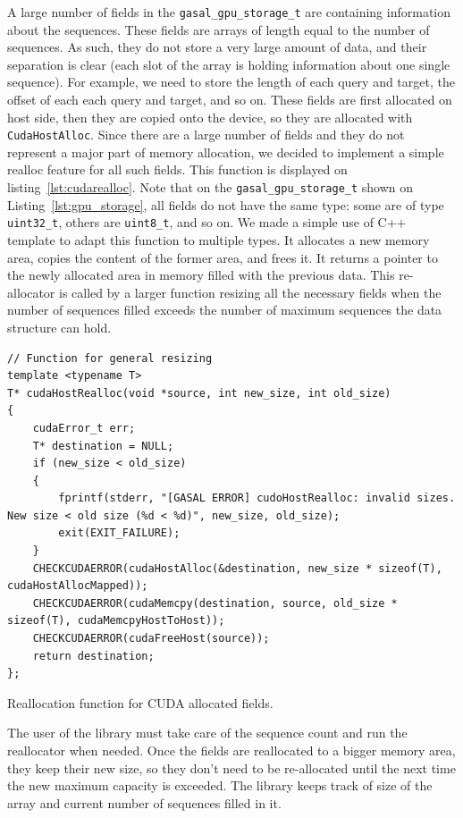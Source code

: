 A large number of fields in the \verb|gasal_gpu_storage_t| are containing information about the sequences. These fields are arrays of length equal to the number of sequences. As such, they do not store a very large amount of data, and their separation is clear (each slot of the array is holding information about one single sequence). For example, we need to store the length of each query and target, the offset of each each query and target, and so on. These fields are first allocated on host side, then they are copied onto the device, so they are allocated with \verb|CudaHostAlloc|. Since there are a large number of fields and they do not represent a major part of memory allocation, we decided to implement a simple realloc feature for all such fields. This function is displayed on listing~\ref{lst:cudarealloc}. Note that on the \verb|gasal_gpu_storage_t| shown on Listing~\ref{lst:gpu_storage}, all fields do not have the same type: some are of type \verb|uint32_t|, others are \verb|uint8_t|, and so on. We made a simple use of C++ template to adapt this function to multiple types. It allocates a new memory area, copies the content of the former area, and frees it. It returns a pointer to the newly allocated area in memory filled with the previous data. This re-allocator is called by a larger function resizing all the necessary fields when the number of sequences filled exceeds the number of maximum sequences the data structure can hold.

\begin{listing}[h!]
	\begin{verbatim}
// Function for general resizing
template <typename T>
T* cudaHostRealloc(void *source, int new_size, int old_size) 
{
	cudaError_t err;
	T* destination = NULL;
	if (new_size < old_size)
	{
		fprintf(stderr, "[GASAL ERROR] cudoHostRealloc: invalid sizes. New size < old size (%d < %d)", new_size, old_size);
		exit(EXIT_FAILURE);
	}
	CHECKCUDAERROR(cudaHostAlloc(&destination, new_size * sizeof(T), cudaHostAllocMapped));
	CHECKCUDAERROR(cudaMemcpy(destination, source, old_size * sizeof(T), cudaMemcpyHostToHost));
	CHECKCUDAERROR(cudaFreeHost(source));
	return destination;
};
	\end{verbatim}
	\caption{Reallocation function for CUDA allocated fields.}
	\label{lst:cudarealloc}
\end{listing}

The user of the library must take care of the sequence count and run the reallocator when needed. Once the fields are reallocated to a bigger memory area, they keep their new size, so they don't need to be re-allocated until the next time the new maximum capacity is exceeded. The library keeps track of size of the array and current number of sequences filled in it. 

